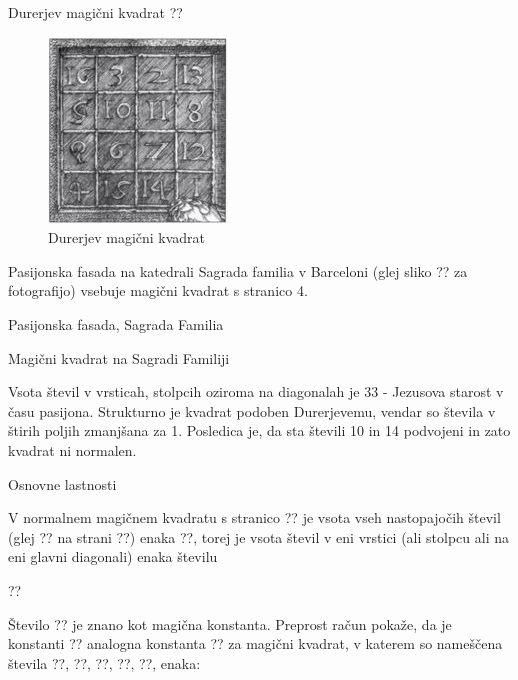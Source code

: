 \documentclass[a4paper,12pt]{article}
\begin{document}
Durerjev magični kvadrat ??
\begin{figure}
\centering
\caption{Durerjev magični kvadrat}
\label{durer}
\includegraphics[scale = 1.3]{durer.jpg}
\end{figure}

Pasijonska fasada na katedrali Sagrada familia v Barceloni (glej sliko
?? za fotografijo) vsebuje magični kvadrat s stranico 4.

Pasijonska fasada, Sagrada Familia

Magični kvadrat na Sagradi Familiji

Vsota števil v vrsticah, stolpcih oziroma na diagonalah je 33 - Jezusova starost
v času pasijona. Strukturno je kvadrat podoben Durerjevemu, vendar so števila
v štirih poljih zmanjšana za 1. Posledica je, da sta števili 10 in 14 podvojeni
in zato kvadrat ni normalen.


Osnovne lastnosti

V normalnem magičnem kvadratu s stranico ?? je vsota vseh nastopajočih
števil (glej ?? na strani ??) enaka
??, torej je vsota
števil v eni vrstici (ali stolpcu ali na eni glavni diagonali) enaka številu

??

Število ?? je znano kot magična konstanta. Preprost račun
pokaže, da je konstanti ?? analogna konstanta ?? za
magični kvadrat, v katerem so nameščena števila ??, ??, ??,
??, ??, enaka:
\end{document}
